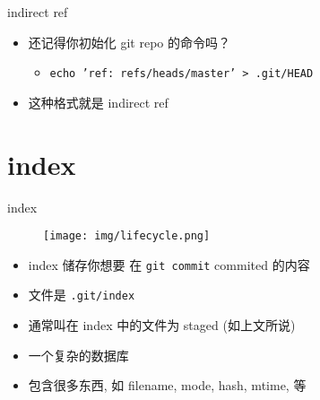 \documentclass[aspectratio=169]{beamer}
\newcommand{\T}[1]{\texttt{#1}}
\begin{document}
\begin{frame}{indirect ref}
  \begin{itemize}
    \item 还记得你初始化 git repo 的命令吗？\begin{itemize}
      \item \T{echo 'ref: refs/heads/master' > .git/HEAD}
    \end{itemize}
    \item 这种格式就是 indirect ref
  \end{itemize}
\end{frame}

\section{index}
\begin{frame}{index}
  \begin{figure}
    \centering
    \texttt{[image: img/lifecycle.png]}
  \end{figure}
  \begin{itemize}
    \item index 储存你想要 在 \T{git commit} commited 的内容
    \item 文件是 \T{.git/index}
    \item 通常叫在 index 中的文件为 staged (如上文所说)
    \item 一个复杂的数据库
    \item 包含很多东西, 如 filename, mode, hash, mtime, 等
  \end{itemize}
\end{frame}
\end{document}

